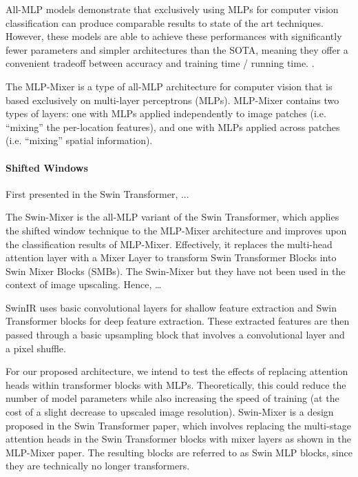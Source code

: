 \documentclass{article}
\begin{document}
All-MLP models demonstrate that exclusively using MLPs for computer vision classification can produce comparable results to state of the art techniques. However, these models are able to achieve these performances with significantly fewer parameters and simpler architectures than the SOTA, meaning they offer a convenient tradeoff between accuracy and training time / running time.
.

The MLP-Mixer is a type of all-MLP architecture for computer vision that is based exclusively on multi-layer perceptrons (MLPs). MLP-Mixer contains two types of layers: one with MLPs applied independently to image patches (i.e. “mixing” the per-location features), and one with MLPs applied across patches (i.e. “mixing” spatial information).

\paragraph{Shifted Windows}

First presented in the Swin Transformer, ...

The Swin-Mixer is the all-MLP variant of the Swin Transformer, which applies the shifted window technique to the MLP-Mixer architecture and improves upon the classification results of MLP-Mixer. Effectively, it replaces the multi-head attention layer with a Mixer Layer to transform Swin Transformer Blocks into Swin Mixer Blocks (SMBs). The Swin-Mixer but they have not been used in the context of image upscaling. Hence, …

SwinIR uses basic convolutional layers for shallow feature extraction and Swin Transformer blocks for deep feature extraction. These extracted features are then passed through a basic upsampling block that involves a convolutional layer and a pixel shuffle.

For our proposed architecture, we intend to test the effects of replacing attention heads within transformer blocks with MLPs. Theoretically, this could reduce the number of model parameters while also increasing the speed of training (at the cost of a slight decrease to upscaled image resolution). Swin-Mixer is a design proposed in the Swin Transformer paper, which involves replacing the multi-stage attention heads in the Swin Transformer blocks with mixer layers as shown in the MLP-Mixer paper. The resulting blocks are referred to as Swin MLP blocks, since they are technically no longer transformers.

\end{document}
